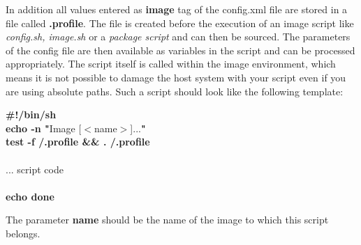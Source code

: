 \begin{itemize}
\end{itemize}

In addition all values entered as \textbf{image} tag of the config.xml
file are stored in a file called \textbf{.profile}. The file is created
before the execution of an image script like \textit{config.sh, image.sh}
or a \textit{package script} and can then be sourced. The parameters
of the config file are then available as variables in the
script and can be processed appropriately. The script itself is called
within the image environment, which means it
is not possible to damage the host system with your script even if you
are using absolute paths. Such a script should look like the following
template:

\begin{Command}{9cm}
\textbf{\#!/bin/sh}\\
\textbf{echo -n "}Image [$<$name$>$]...\textbf{"}\\
\textbf{test -f /.profile \&\& . /.profile}\\
\\
... script code\\
\\
\textbf{echo done}
\end{Command}

The parameter \textbf{name} should be the name of the image to which this
script belongs.
